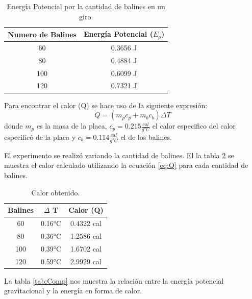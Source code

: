 \documentclass[12pt]{article}
\begin{document}
	\begin{table}[H]
		\centering
		\begin{tabular}{|c|c|}
			\hline
			\textbf{Numero de Balines} & \textbf{Energía Potencial} ($E_p$) \\ \hline
			60   & 0.3656  J \\ \hline
			80   & 0.4884  J \\ \hline
			100  & 0.6099  J \\ \hline
			120  & 0.7321  J \\ \hline
		\end{tabular}
		\caption{Energía Potencial por la cantidad de balines en un giro.}
		\label{tab:PE}
	\end{table}
	
Para encontrar el calor (Q) se hace uso de la siguiente expresión:
\begin{equation}\label{eq:Q}
Q = (m_p c_p + m_b c_b) \Delta T
\end{equation}
donde $m_p$ es la masa de la placa, $c_p = 0.215 \frac{cal}{g°C}$ el calor especifico del calor especificó de la placa y $c_b = 0.114 \frac{cal}{g°C}$  el de los balines.

El experimento se realizó variando la cantidad de balines. El la tabla \ref{tab:Q60} se muestra el calor calculado utilizando la ecuación \eqref{eq:Q} para cada cantidad de balines.
	
	\begin{table}[H]
		\centering
		\begin{tabular}{|c|c|c|}
			\hline
			\textbf{Balines} & $\Delta$ \textbf{T} & \textbf{Calor} (Q) \\ \hline
			60   & 0.16°C  & 0.4322 cal \\ \hline
			80   & 0.36°C  & 1.2586 cal \\ \hline
			100  & 0.39°C  & 1.6702 cal \\ \hline
			120  & 0.59°C  & 2.9929 cal \\ \hline
		\end{tabular}
		\caption{Calor obtenido.}
		\label{tab:Q60}
	\end{table}

La tabla \ref{tab:Comp} nos muestra la relación entre la energía potencial gravitacional y la energía en forma de calor.
	
\end{document}
